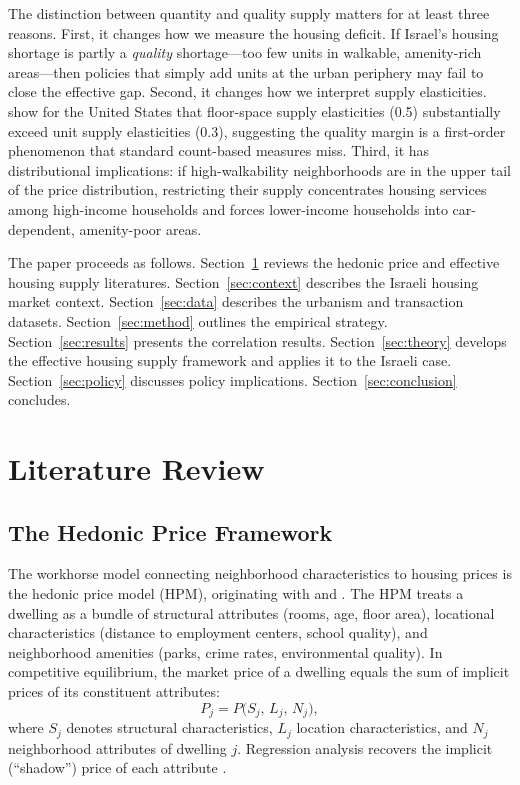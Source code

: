 \documentclass[12pt,a4paper]{article}
\begin{document}
The distinction between quantity and quality supply matters for at least three
reasons.  First, it changes how we measure the housing deficit.  If Israel's
housing shortage is partly a \textit{quality} shortage—too few units in
walkable, amenity-rich areas—then policies that simply add units at the urban
periphery may fail to close the effective gap.  Second, it changes how we
interpret supply elasticities.  \citet{baumsnow2024} show for the United States
that floor-space supply elasticities (0.5) substantially exceed unit supply
elasticities (0.3), suggesting the quality margin is a first-order phenomenon
that standard count-based measures miss.  Third, it has distributional
implications: if high-walkability neighborhoods are in the upper tail of the
price distribution, restricting their supply concentrates housing services among
high-income households and forces lower-income households into car-dependent,
amenity-poor areas.

The paper proceeds as follows.  Section~\ref{sec:lit} reviews the hedonic price
and effective housing supply literatures.
Section~\ref{sec:context} describes the Israeli housing market context.
Section~\ref{sec:data} describes the urbanism and transaction datasets.
Section~\ref{sec:method} outlines the empirical strategy.
Section~\ref{sec:results} presents the correlation results.
Section~\ref{sec:theory} develops the effective housing supply framework and
applies it to the Israeli case.
Section~\ref{sec:policy} discusses policy implications.
Section~\ref{sec:conclusion} concludes.

\section{Literature Review}
\label{sec:lit}

\subsection{The Hedonic Price Framework}
\label{sec:lit_hedonic}

The workhorse model connecting neighborhood characteristics to housing prices is
the hedonic price model (HPM), originating with \citet{rosen1974} and
\citet{harrison1978}.  The HPM treats a dwelling as a bundle of structural
attributes (rooms, age, floor area), locational characteristics (distance to
employment centers, school quality), and neighborhood amenities (parks, crime
rates, environmental quality).  In competitive equilibrium, the market price of
a dwelling equals the sum of implicit prices of its constituent attributes:
\begin{equation}
\label{eq:hedonic}
  P_j = P\bigl(S_j,\, L_j,\, N_j\bigr),
\end{equation}
where $S_j$ denotes structural characteristics, $L_j$ location characteristics,
and $N_j$ neighborhood attributes of dwelling $j$.  Regression analysis
recovers the implicit (``shadow'') price of each attribute \citep{malpezzi2003}.
\end{document}
